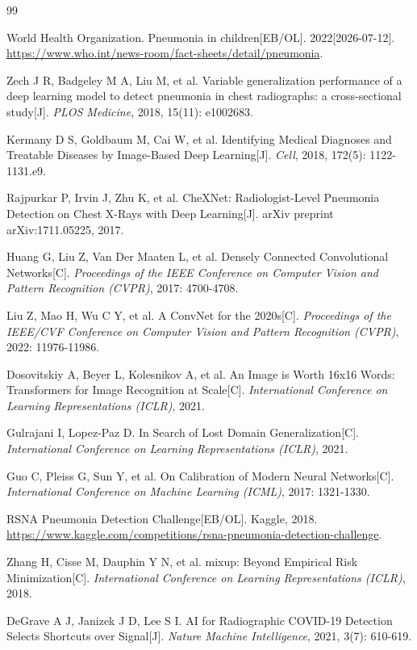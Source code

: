 \documentclass[12pt,a4paper,UTF8,openany]{ctexbook}
\begin{document}
\begin{thebibliography}{99}

World Health Organization.
Pneumonia in children[EB/OL].
2022[2026-07-12].
\url{https://www.who.int/news-room/fact-sheets/detail/pneumonia}.

Zech J R, Badgeley M A, Liu M, et al.
Variable generalization performance of a deep learning model to detect pneumonia in chest radiographs: a cross-sectional study[J].
\textit{PLOS Medicine}, 2018, 15(11): e1002683.

Kermany D S, Goldbaum M, Cai W, et al.
Identifying Medical Diagnoses and Treatable Diseases by Image-Based Deep Learning[J].
\textit{Cell}, 2018, 172(5): 1122-1131.e9.

Rajpurkar P, Irvin J, Zhu K, et al.
CheXNet: Radiologist-Level Pneumonia Detection on Chest X-Rays with Deep Learning[J].
arXiv preprint arXiv:1711.05225, 2017.

Huang G, Liu Z, Van Der Maaten L, et al.
Densely Connected Convolutional Networks[C].
\textit{Proceedings of the IEEE Conference on Computer Vision and Pattern Recognition (CVPR)}, 2017: 4700-4708.

Liu Z, Mao H, Wu C Y, et al.
A ConvNet for the 2020s[C].
\textit{Proceedings of the IEEE/CVF Conference on Computer Vision and Pattern Recognition (CVPR)}, 2022: 11976-11986.

Dosovitskiy A, Beyer L, Kolesnikov A, et al.
An Image is Worth 16x16 Words: Transformers for Image Recognition at Scale[C].
\textit{International Conference on Learning Representations (ICLR)}, 2021.

Gulrajani I, Lopez-Paz D.
In Search of Lost Domain Generalization[C].
\textit{International Conference on Learning Representations (ICLR)}, 2021.

Guo C, Pleiss G, Sun Y, et al.
On Calibration of Modern Neural Networks[C].
\textit{International Conference on Machine Learning (ICML)}, 2017: 1321-1330.

RSNA Pneumonia Detection Challenge[EB/OL].
Kaggle, 2018.
\url{https://www.kaggle.com/competitions/rsna-pneumonia-detection-challenge}.

Zhang H, Cisse M, Dauphin Y N, et al.
mixup: Beyond Empirical Risk Minimization[C].
\textit{International Conference on Learning Representations (ICLR)}, 2018.

DeGrave A J, Janizek J D, Lee S I.
AI for Radiographic COVID-19 Detection Selects Shortcuts over Signal[J].
\textit{Nature Machine Intelligence}, 2021, 3(7): 610-619.

\end{thebibliography}
\end{document}
